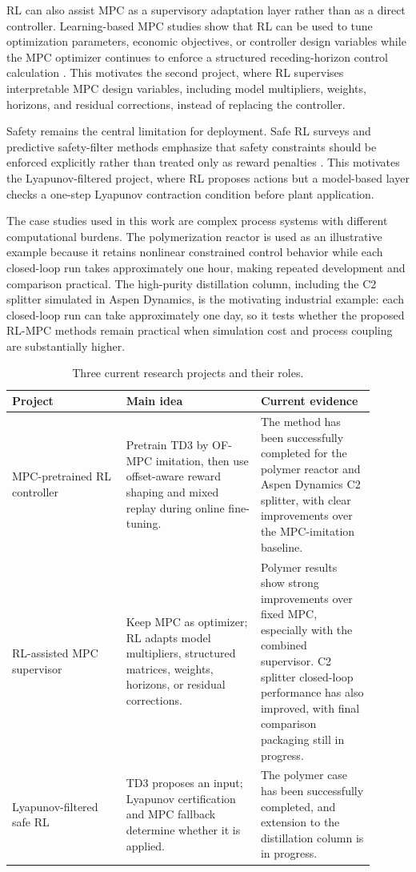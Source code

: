 \documentclass[10pt]{article}
\begin{document}
RL can also assist MPC as a supervisory adaptation layer rather than as a direct controller. Learning-based MPC studies show that RL can be used to tune optimization parameters, economic objectives, or controller design variables while the MPC optimizer continues to enforce a structured receding-horizon control calculation \cite{gros2020data}. This motivates the second project, where RL supervises interpretable MPC design variables, including model multipliers, weights, horizons, and residual corrections, instead of replacing the controller.

Safety remains the central limitation for deployment. Safe RL surveys and predictive safety-filter methods emphasize that safety constraints should be enforced explicitly rather than treated only as reward penalties \cite{garcia2015safe,wabersich2021predictive}. This motivates the Lyapunov-filtered project, where RL proposes actions but a model-based layer checks a one-step Lyapunov contraction condition before plant application.

The case studies used in this work are complex process systems with different computational burdens. The polymerization reactor is used as an illustrative example because it retains nonlinear constrained control behavior while each closed-loop run takes approximately one hour, making repeated development and comparison practical. The high-purity distillation column, including the C2 splitter simulated in Aspen Dynamics, is the motivating industrial example: each closed-loop run can take approximately one day, so it tests whether the proposed RL-MPC methods remain practical when simulation cost and process coupling are substantially higher.

\begin{table}[h]
\centering
\small
\caption{Three current research projects and their roles.}
\begin{tabular}{p{0.28\linewidth}p{0.33\linewidth}p{0.29\linewidth}}
\toprule
\textbf{Project} & \textbf{Main idea} & \textbf{Current evidence} \\
\midrule
MPC-pretrained RL controller & Pretrain TD3 by OF-MPC imitation, then use offset-aware reward shaping and mixed replay during online fine-tuning. & The method has been successfully completed for the polymer reactor and Aspen Dynamics C2 splitter, with clear improvements over the MPC-imitation baseline. \\
RL-assisted MPC supervisor & Keep MPC as optimizer; RL adapts model multipliers, structured matrices, weights, horizons, or residual corrections. & Polymer results show strong improvements over fixed MPC, especially with the combined supervisor. C2 splitter closed-loop performance has also improved, with final comparison packaging still in progress. \\
Lyapunov-filtered safe RL & TD3 proposes an input; Lyapunov certification and MPC fallback determine whether it is applied. & The polymer case has been successfully completed, and extension to the distillation column is in progress. \\
\bottomrule
\end{tabular}
\end{table}
\end{document}
